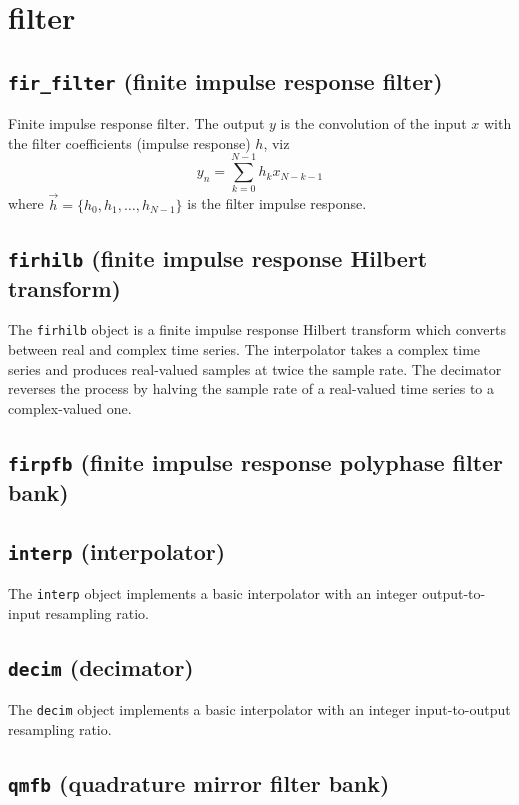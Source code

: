 % 
%
\section{filter}
\label{module:filter}

\subsection{{\tt fir\_filter} (finite impulse response filter)}
Finite impulse response filter.
The output $y$ is the convolution of the input $x$ with the filter
coefficients (impulse response) $h$, viz
\[
    y_n = \sum_{k=0}^{N-1}{ h_k x_{N-k-1} }
\]
where $\vec{h} = \{h_0,h_1,\ldots,h_{N-1}\}$ is the filter impulse response.

\subsection{{\tt firhilb} (finite impulse response Hilbert transform)}
The {\tt firhilb} object is a finite impulse response Hilbert transform which
converts between real and complex time series.
The interpolator takes a complex time series and produces real-valued samples
at twice the sample rate.
The decimator reverses the process by halving the sample rate of a real-valued
time series to a complex-valued one.



\subsection{{\tt firpfb} (finite impulse response polyphase filter bank)}

\subsection{{\tt interp} (interpolator)}
The {\tt interp} object implements a basic interpolator with an integer
output-to-input resampling ratio.

\subsection{{\tt decim} (decimator)}
The {\tt decim} object implements a basic interpolator with an integer
input-to-output resampling ratio.

\subsection{{\tt qmfb} (quadrature mirror filter bank)}

